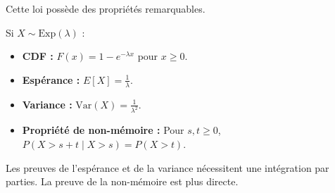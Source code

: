 Cette loi possède des propriétés remarquables.

\begin{theorembox}
Si $X \sim \text{Exp}(\lambda)$ :
\begin{itemize}
    \item \textbf{CDF :} $F(x) = 1 - e^{-\lambda x}$ pour $x \ge 0$.
    \item \textbf{Espérance :} $E[X] = \frac{1}{\lambda}$.
    \item \textbf{Variance :} $\text{Var}(X) = \frac{1}{\lambda^2}$.
    \item \textbf{Propriété de non-mémoire :} Pour $s, t \ge 0$, $P(X > s+t \mid X > s) = P(X > t)$.
\end{itemize}
\end{theorembox}

Les preuves de l'espérance et de la variance nécessitent une intégration par parties. La preuve de la non-mémoire est plus directe.

